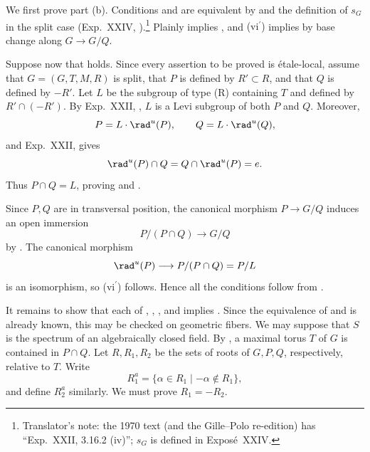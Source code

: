 \SGAProof
We first prove part \textup{(b)}.  Conditions \textup{} and
\textup{} are equivalent by \textup{} and the
definition of \(s_G\) in the split case (Exp.\ XXIV,
\textup{}).\footnote{Translator's note: the 1970 text (and the Gille--Polo re-edition)
has ``Exp.~XXII, 3.16.2 (iv)''; \(s_G\) is defined in Exposé~XXIV.}  Plainly \textup{} implies \textup{}, and
\textup{(vi\(^{\prime}\))} implies \textup{} by base change along
\(G\to G/Q\).

Suppose now that \textup{} holds.  Since every assertion to be
proved is étale-local, assume that \(G=(G,T,M,R)\) is split, that \(P\)
is defined by \(R'\subset R\), and that \(Q\) is defined by \(-R'\).
Let \(L\) be the subgroup of type \textup{(R)} containing \(T\) and
defined by \(R'\cap(-R')\).  By Exp.\ XXII, , \(L\) is a Levi
subgroup of both \(P\) and \(Q\).  Moreover,
\[
 P=L\cdot\rad^u(P),\qquad Q=L\cdot\rad^u(Q),
\]
and Exp.\ XXII,  gives
\[
 \rad^u(P)\cap Q=Q\cap\rad^u(P)=e.
\]
Thus \(P\cap Q=L\), proving \textup{} and \textup{}.

Since \(P,Q\) are in transversal position, the canonical morphism
\(P\to G/Q\) induces an open immersion
\[
 P/(P\cap Q)\longrightarrow G/Q
\]
by .  The canonical morphism
\[
 \rad^u(P)\longrightarrow P/(P\cap Q)=P/L
\]
is an isomorphism, so \textup{(vi\(^{\prime}\))} follows.  Hence all
the conditions follow from \textup{}.

It remains to show that each of \textup{}, \textup{},
\textup{}, and \textup{} implies \textup{}.  Since the
equivalence of \textup{} and \textup{} is already known, this
may be checked on geometric fibers.  We may suppose that \(S\) is the
spectrum of an algebraically closed field.  By , a maximal torus
\(T\) of \(G\) is contained in \(P\cap Q\).  Let \(R,R_1,R_2\) be the
sets of roots of \(G,P,Q\), respectively, relative to \(T\).  Write
\[
 R_1^a=\{\alpha\in R_1\mid-\alpha\notin R_1\},
\]
and define \(R_2^a\) similarly.  We must prove \(R_1=-R_2\).

